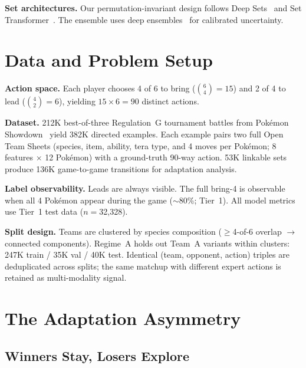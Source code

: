 \documentclass{article}
\begin{document}
\textbf{Set architectures.}
Our permutation-invariant design follows Deep Sets~\cite{deepsets} and Set Transformer~\cite{settransformer}.
The ensemble uses deep ensembles~\cite{deepensembles} for calibrated uncertainty.


\section{Data and Problem Setup}
\label{sec:data}

\textbf{Action space.}
Each player chooses 4 of 6 to bring ($\binom{6}{4}=15$) and 2 of 4 to lead ($\binom{4}{2}=6$), yielding $15 \times 6 = 90$ distinct actions.

\textbf{Dataset.}
212K best-of-three Regulation~G tournament battles from Pok\'emon Showdown~\cite{vgcbench} yield 382K directed examples.
Each example pairs two full Open Team Sheets (species, item, ability, tera type, and 4 moves per Pok\'emon; 8 features $\times$ 12 Pok\'emon) with a ground-truth 90-way action.
53K linkable sets produce 136K game-to-game transitions for adaptation analysis.

\textbf{Label observability.}
Leads are always visible.
The full bring-4 is observable when all 4 Pok\'emon appear during the game (${\sim}$80\%; Tier~1).
All model metrics use Tier~1 test data ($n{=}$32,328).

\textbf{Split design.}
Teams are clustered by species composition ($\geq$4-of-6 overlap $\to$ connected components).
Regime~A holds out Team~A variants within clusters: 247K train / 35K val / 40K test.
Identical (team, opponent, action) triples are deduplicated across splits; the same matchup with different expert actions is retained as multi-modality signal.


\section{The Adaptation Asymmetry}
\label{sec:asymmetry}

\subsection{Winners Stay, Losers Explore}
\label{sec:wsle}
\end{document}
